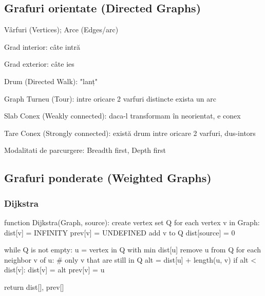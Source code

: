 \documentclass[11pt,a4paper]{report}
\begin{document}
\subsection*{Grafuri orientate (Directed Graphs)}
\begin{description}\setlength{\itemsep}{-2pt}
  \item Vârfuri (Vertices); Arce (Edges/arc)
  \item Grad interior: câte intră
  \item Grad exterior: câte ies
  \item Drum (Directed Walk): "lanț"
  \item Graph Turneu (Tour): intre oricare 2 varfuri distincte exista un arc
  \item Slab Conex (Weakly connected): daca-l transformam în neorientat, e conex
  \item Tare Conex (Strongly connected): există drum intre oricare 2 varfuri, dus-intors
  \item Modalitati de parcurgere: Breadth first, Depth first
\end{description}
\subsection*{Grafuri ponderate (Weighted Graphs)}
\subsubsection*{Dijkstra}
\begin{py}
function Dijkstra(Graph, source):
    create vertex set Q
    for each vertex v in Graph:             
        dist[v] = INFINITY                  
        prev[v] = UNDEFINED                 
        add v to Q                      
    dist[source] = 0                        
    
    while Q is not empty:
        u = vertex in Q with min dist[u]    
        remove u from Q 
        for each neighbor v of u:           # only v that are still in Q
            alt = dist[u] + length(u, v)
            if alt < dist[v]:               
                dist[v] = alt 
                prev[v] = u 

    return dist[], prev[]
\end{py}
\end{document}
